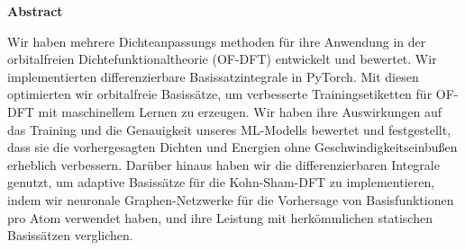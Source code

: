	\vspace{5cm}
\begin{center}
	\large
    \textbf{Abstract}
\end{center}
\normalsize
Wir haben mehrere Dichteanpassungs methoden für ihre Anwendung in der orbitalfreien Dichtefunktionaltheorie (OF-DFT) entwickelt und bewertet. Wir implementierten differenzierbare Basissatzintegrale in PyTorch. Mit diesen optimierten wir orbitalfreie Basissätze, um verbesserte Trainingsetiketten für OF-DFT mit maschinellem Lernen zu erzeugen. Wir haben ihre Auswirkungen auf das Training und die Genauigkeit unseres ML-Modells bewertet und festgestellt, dass sie die vorhergesagten Dichten und Energien ohne Geschwindigkeitseinbußen erheblich verbessern. Darüber hinaus haben wir die differenzierbaren Integrale genutzt, um adaptive Basissätze für die Kohn-Sham-DFT zu implementieren, indem wir neuronale Graphen-Netzwerke für die Vorhersage von Basisfunktionen pro Atom verwendet haben, und ihre Leistung mit herkömmlichen statischen Basissätzen verglichen.


